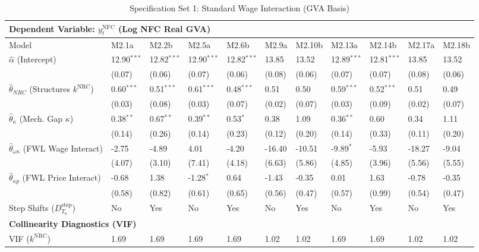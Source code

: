 \begin{table}[H]
\centering
\setlength{\tabcolsep}{1.5pt}
\caption{Specification Set 1: Standard Wage Interaction (GVA Basis)}
\label{tab:specB_set1_gva}
\tiny
\begin{tabular}{p{3.5cm}p{1.0cm}p{1.0cm}p{1.0cm}p{1.0cm}p{1.0cm}p{1.0cm}p{1.0cm}p{1.0cm}p{1.0cm}p{1.0cm}}
\toprule
\multicolumn{11}{l}{\textbf{Dependent Variable: $y_t^{\text{NFC}}$ (Log NFC Real GVA)}} \\
\midrule
Model & M2.1a & M2.2b & M2.5a & M2.6b & M2.9a & M2.10b & M2.13a & M2.14b & M2.17a & M2.18b \\
\midrule
$\hat{\alpha}$ (Intercept) & 12.90$^{***}$ & 12.82$^{***}$ & 12.90$^{***}$ & 12.82$^{***}$ & 13.85 & 13.52 & 12.89$^{***}$ & 12.81$^{***}$ & 13.85 & 13.52 \\
 & (0.07) & (0.06) & (0.07) & (0.06) & (0.08) & (0.06) & (0.07) & (0.07) & (0.08) & (0.06) \\
$\hat{\theta}_{NRC}$ (Structures $k^{\text{NRC}}$) & 0.60$^{***}$ & 0.51$^{***}$ & 0.61$^{***}$ & 0.48$^{***}$ & 0.51 & 0.50 & 0.59$^{***}$ & 0.52$^{***}$ & 0.51 & 0.49 \\
 & (0.03) & (0.08) & (0.03) & (0.07) & (0.02) & (0.07) & (0.03) & (0.09) & (0.02) & (0.07) \\
$\hat{\theta}_{\kappa}$ (Mech. Gap $\kappa$) & 0.38$^{**}$ & 0.67$^{**}$ & 0.39$^{**}$ & 0.53$^{*}$ & 0.38 & 1.09 & 0.36$^{**}$ & 0.60 & 0.34 & 1.11 \\
 & (0.14) & (0.26) & (0.14) & (0.23) & (0.12) & (0.20) & (0.14) & (0.33) & (0.11) & (0.20) \\
$\hat{\theta}_{\omega\kappa}$ (FWL Wage Interact) & -2.75 & -4.89 & 4.01 & -4.20 & -16.40 & -10.51 & -9.89$^{*}$ & -5.93 & -18.27 & -9.04 \\
 & (4.07) & (3.10) & (7.41) & (4.18) & (6.63) & (5.86) & (4.85) & (3.96) & (5.56) & (5.55) \\
$\hat{\theta}_{\kappa p}$ (FWL Price Interact) & -0.68 & 1.38 & -1.28$^{*}$ & 0.64 & -1.43 & -0.35 & 0.01 & 1.63 & -0.78 & -0.35 \\
 & (0.58) & (0.82) & (0.61) & (0.65) & (0.56) & (0.47) & (0.57) & (0.99) & (0.54) & (0.47) \\
Step Shifts ($D_{T_b}^{\text{step}}$) & No & Yes & No & Yes & No & Yes & No & Yes & No & Yes \\
\midrule
\multicolumn{11}{l}{\textbf{Collinearity Diagnostics (VIF)}} \\
VIF ($k^{\text{NRC}}$) & 1.69 & 1.69 & 1.69 & 1.69 & 1.02 & 1.02 & 1.69 & 1.69 & 1.02 & 1.02 \\

\end{tabular}
\end{table}
